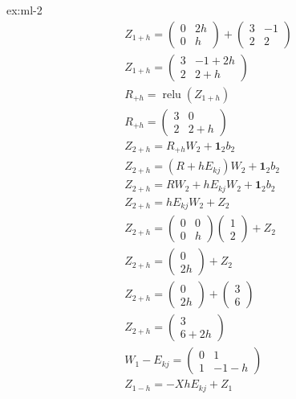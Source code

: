 \begin{solution}{ex:ml-2}
\[\begin{gathered}
      Z_{1+h}=\begin{pmatrix}0&2h\\0&h\end{pmatrix}+\begin{pmatrix}3&-1\\2&2\end{pmatrix}\\
      Z_{1+h}=\begin{pmatrix}3&-1+2h\\2&2+h\end{pmatrix}\\
      R_{+h}=\operatorname{relu}(Z_{1+h})\\
      R_{+h}=\begin{pmatrix}3&0\\2&2+h\end{pmatrix}\\
      Z_{2+h}=R_{+h}W_2+\mathbf{1}_2b_2\\
      Z_{2+h}=(R+hE_{kj})W_2+\mathbf{1}_2b_2\\
      Z_{2+h}=RW_2+hE_{kj}W_2+\mathbf{1}_2b_2\\
      Z_{2+h}=hE_{kj}W_2+Z_2\\
      Z_{2+h}=\begin{pmatrix}0&0\\0&h\end{pmatrix}\begin{pmatrix}1\\2\end{pmatrix}+Z_2\\
      Z_{2+h}=\begin{pmatrix}0\\2h\end{pmatrix}+Z_2\\
      Z_{2+h}=\begin{pmatrix}0\\2h\end{pmatrix}+\begin{pmatrix}3\\6\end{pmatrix}\\
      Z_{2+h}=\begin{pmatrix}3\\6+2h\end{pmatrix}\\
      W_1-E_{kj}=\begin{pmatrix}0&1\\1&-1-h\end{pmatrix}\\
      Z_{1-h}=-XhE_{kj}+Z_1\\

\end{gathered}\]
\end{solution}
